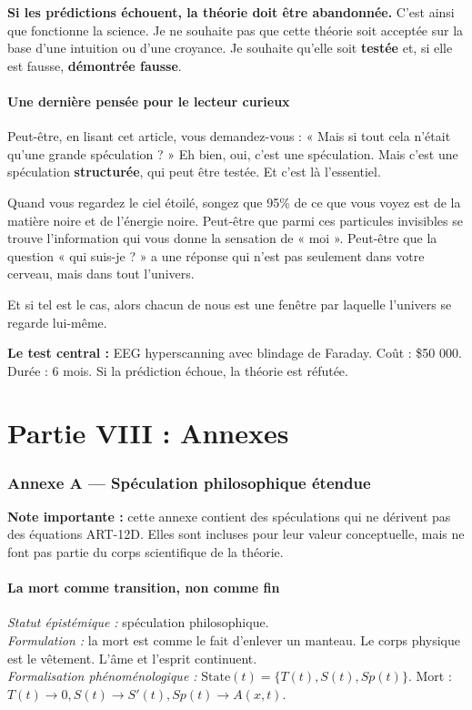\documentclass[11pt,a4paper]{article}
\begin{document}
\textbf{Si les prédictions échouent, la théorie doit être abandonnée.} C'est ainsi que fonctionne la science. Je ne souhaite pas que cette théorie soit acceptée sur la base d'une intuition ou d'une croyance. Je souhaite qu'elle soit \textbf{testée} et, si elle est fausse, \textbf{démontrée fausse}.

\subsection{Une dernière pensée pour le lecteur curieux}
Peut-être, en lisant cet article, vous demandez-vous : « Mais si tout cela n'était qu'une grande spéculation ? » Eh bien, oui, c'est une spéculation. Mais c'est une spéculation \textbf{structurée}, qui peut être testée. Et c'est là l'essentiel.

Quand vous regardez le ciel étoilé, songez que 95\% de ce que vous voyez est de la matière noire et de l'énergie noire. Peut-être que parmi ces particules invisibles se trouve l'information qui vous donne la sensation de « moi ». Peut-être que la question « qui suis-je ? » a une réponse qui n'est pas seulement dans votre cerveau, mais dans tout l'univers.

Et si tel est le cas, alors chacun de nous est une fenêtre par laquelle l'univers se regarde lui-même.

\textbf{Le test central :} EEG hyperscanning avec blindage de Faraday. Coût : \$50 000. Durée : 6 mois. Si la prédiction échoue, la théorie est réfutée.

\newpage
\part*{Partie VIII : Annexes}

\section{Annexe A --- Spéculation philosophique étendue}
\textbf{Note importante :} cette annexe contient des spéculations qui ne dérivent pas des équations ART-12D. Elles sont incluses pour leur valeur conceptuelle, mais ne font pas partie du corps scientifique de la théorie.

\subsection{La mort comme transition, non comme fin}
\textit{Statut épistémique :} spéculation philosophique. \\
\textit{Formulation :} la mort est comme le fait d'enlever un manteau. Le corps physique est le vêtement. L'âme et l'esprit continuent. \\
\textit{Formalisation phénoménologique :} $\text{State}(t) = \{ T(t), S(t), Sp(t) \}$. Mort : $T(t) \to 0, S(t) \to S'(t), Sp(t) \to A(x,t)$.
\end{document}
